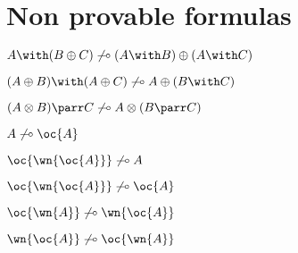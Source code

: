 \section{Non provable formulas}\label{non-provable-formulas}

\(A \with (B\plus C) \not\limp (A\with B)\plus (A\with C)\)

\((A\plus B)\with (A\plus C) \not\limp A\plus (B\with C)\)

\((A\tens B)\parr C \not\limp A\tens (B\parr C)\)

\(A \not\limp \oc{A}\)

\(\oc{\wn{\oc{A}}} \not\limp A\)

\(\oc{\wn{\oc{A}}} \not\limp \oc{A}\)

\(\oc{\wn{A}} \not\limp \wn{\oc{A}}\)

\(\wn{\oc{A}} \not\limp \oc{\wn{A}}\)

